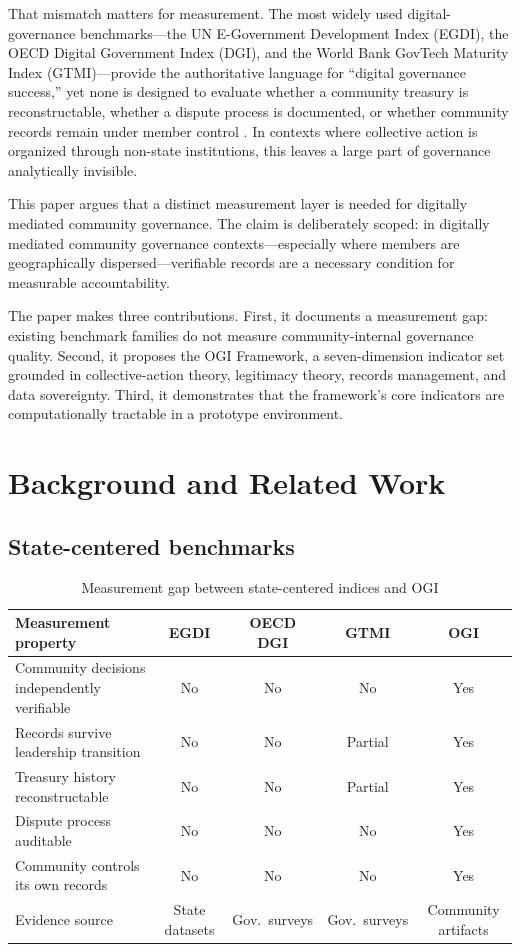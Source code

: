 \documentclass[sigconf,anonymous]{acmart}
\begin{document}
That mismatch matters for measurement. The most widely used digital-governance benchmarks---the UN E-Government Development Index (EGDI), the OECD Digital Government Index (DGI), and the World Bank GovTech Maturity Index (GTMI)---provide the authoritative language for ``digital governance success,'' yet none is designed to evaluate whether a community treasury is reconstructable, whether a dispute process is documented, or whether community records remain under member control \cite{un2024,oecd2024,wb2025}. In contexts where collective action is organized through non-state institutions, this leaves a large part of governance analytically invisible.

This paper argues that a distinct measurement layer is needed for digitally mediated community governance. The claim is deliberately scoped: in digitally mediated community governance contexts---especially where members are geographically dispersed---verifiable records are a necessary condition for measurable accountability.

The paper makes three contributions. First, it documents a measurement gap: existing benchmark families do not measure community-internal governance quality. Second, it proposes the OGI Framework, a seven-dimension indicator set grounded in collective-action theory, legitimacy theory, records management, and data sovereignty. Third, it demonstrates that the framework's core indicators are computationally tractable in a prototype environment.

\section{Background and Related Work}

\subsection{State-centered benchmarks}

\begin{table}[t]
\caption{Measurement gap between state-centered indices and OGI}
\label{tab:gap}
\small
\begin{tabularx}{\textwidth}{Ycccc}
\toprule
Measurement property & EGDI & OECD DGI & GTMI & OGI \\
\midrule
Community decisions independently verifiable & No & No & No & Yes \\
Records survive leadership transition & No & No & Partial & Yes \\
Treasury history reconstructable & No & No & Partial & Yes \\
Dispute process auditable & No & No & No & Yes \\
Community controls its own records & No & No & No & Yes \\
Evidence source & State datasets & Gov.\ surveys & Gov.\ surveys & Community artifacts \\
\bottomrule
\end{tabularx}
\end{table}
\end{document}
